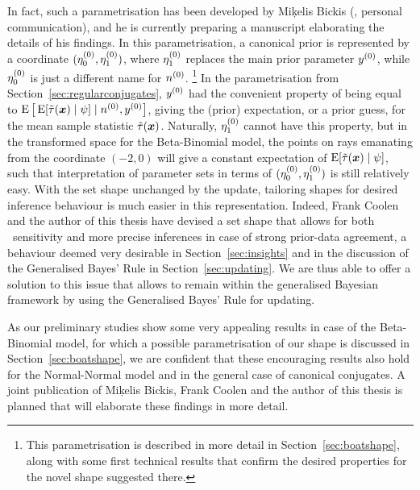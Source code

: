 In fact, such a parametrisation has been developed by Mi\c{k}elis Bickis (\cite*{2011:bickis:geomip}, personal communication),
and he is currently preparing a manuscript elaborating the details of his findings.
In this parametrisation, a canonical prior is represented by a coordinate $(\eta_0^{(0)},\eta_1^{(0)})$,
where $\eta_1^{(0)}$ replaces the main prior parameter $y^{(0)}$,
while $\eta_0^{(0)}$ is just a different name for $n^{(0)}$.%
\footnote{This parametrisation is described in more detail in Section~\ref{sec:boatshape},
along with some first technical results that confirm the desired properties for the novel shape suggested there.}
In the parametrisation from Section~\ref{sec:regularconjugates},
$y^{(0)}$ had the convenient property of being equal to $\operatorname{E}\big[\operatorname{E}[\tilde{\tau}({\bm x}) \mid \psi] \mid n^{(0)}, y^{(0)}\big]$,
giving the (prior) expectation, or a prior guess, for the mean sample statistic $\tilde{\tau}({\bm x})$.
Naturally, $\eta_1^{(0)}$ cannot have this property,
but in the transformed space for the Beta-Binomial model, the points on rays emanating from the coordinate $(-2,0)$
will give a constant expectation of $\operatorname{E}[\tilde{\tau}({\bm x}) \mid \psi]$,
such that interpretation of parameter sets in terms of $(\eta_0^{(0)},\eta_1^{(0)})$ is still relatively easy.
With the set shape unchanged by the update, 
tailoring shapes for desired inference behaviour is much easier in this representation.
Indeed, Frank Coolen and the author of this thesis have devised
a set shape %
that allows for both \pdc\ sensitivity
and more precise inferences in case of strong prior-data agreement,
a behaviour deemed very desirable in Section~\ref{sec:insights}
and in the discussion of the Generalised Bayes' Rule in Section~\ref{sec:updating}.
We are thus able to offer a solution to this issue that allows to remain within the generalised Bayesian framework
by using the Generalised Bayes' Rule for updating.

As our preliminary studies show some very appealing results in case of the Beta-Binomial model,
for which a possible parametrisation of our shape is discussed in Section~\ref{sec:boatshape},
we are confident that these encouraging results also hold for the Normal-Normal model
and in the general case of canonical conjugates.
A joint publication of Mi\c{k}elis Bickis, Frank Coolen and the author of this thesis is planned
that will elaborate these findings in more detail.

